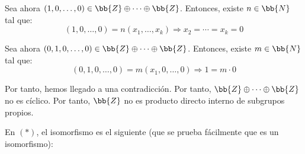 \begin{ejercicio}
\begin{enumerate}
        Sea ahora $(1,0,\dots, 0)\in \bb{Z}\oplus \cdots \oplus \bb{Z}$. Entonces, existe $n\in \bb{N}$ tal que:
        \begin{equation*}
            (1,0,\ldots,0) = n(x_1,\ldots,x_k)\Longrightarrow x_2=\cdots=x_k=0
        \end{equation*}

        Sea ahora $(0,1,0,\ldots,0)\in \bb{Z}\oplus \cdots \oplus \bb{Z}$. Entonces, existe $m\in \bb{N}$ tal que:
        \begin{equation*}
            (0,1,0,\ldots,0) = m(x_1,0,\ldots,0)\Longrightarrow 1=m\cdot 0
        \end{equation*}

        Por tanto, hemos llegado a una contradicción. Por tanto, $\bb{Z}\oplus \cdots \oplus \bb{Z}$ no es cíclico. Por tanto, $\bb{Z}$ no es producto directo interno de subgrupos propios.

        En $(\ast)$, el isomorfismo es el siguiente (que se prueba fácilmente que es un isomorfismo):
    \end{enumerate}
\end{ejercicio}



